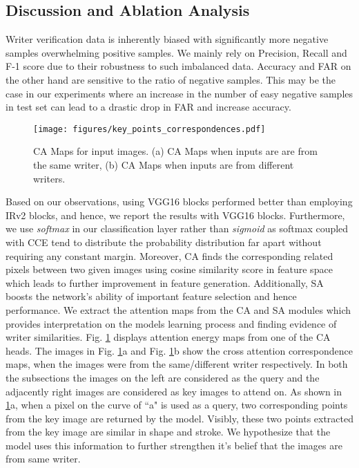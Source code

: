 \documentclass[a4paper,conference]{IEEEtran}
\begin{document}
\subsection{Discussion and Ablation Analysis}
Writer verification data is inherently biased with significantly more negative samples overwhelming positive samples. We mainly rely on Precision, Recall and F-1 score due to their robustness to such imbalanced data. Accuracy and FAR on the other hand are sensitive to the ratio of negative samples. This may be the case in our experiments where an increase in the number of easy negative samples in test set can lead to a drastic drop in FAR and increase accuracy. 
\begin{figure}[!htp]
\begin{center}
\texttt{[image: figures/key\_points\_correspondences.pdf]}
\caption{\label{fig:ca_attentionmaps} CA Maps for input images. (a) CA Maps when inputs are are from the same writer, (b) CA Maps when inputs are from different writers.}
\end{center}
\end{figure}

Based on our observations, using VGG16 blocks performed better than employing IRv2 blocks, and hence, we report the results with VGG16 blocks.
Furthermore, we use \textit{softmax} in our classification layer rather than \textit{sigmoid} as softmax coupled with CCE tend to distribute the probability distribution far apart without requiring any constant margin.  Moreover, CA finds the corresponding related pixels between two given images using cosine similarity score in feature space which leads to further improvement in feature generation. Additionally, SA boosts the network's ability of important feature selection and hence performance.
\newline \indent We extract the attention maps from the CA and SA modules which provides interpretation on the models learning process and finding evidence of writer similarities. Fig. \ref{fig:ca_attentionmaps} displays attention energy maps from one of the CA heads. The images in Fig. \ref{fig:ca_attentionmaps}a and Fig. \ref{fig:ca_attentionmaps}b show the cross attention correspondence maps, when the images were from the same/different writer respectively. In both the subsections the images on the left are considered as the query and the adjacently right images are considered as key images to attend on. As shown in \ref{fig:ca_attentionmaps}a, when a pixel on the curve of ``a" is used as a query, two corresponding points from the key image are returned by the model. Visibly, these two points extracted from the key image are similar in shape and stroke. We hypothesize that the model uses this information to further strengthen it's belief that the images are from same writer. 
\end{document}

